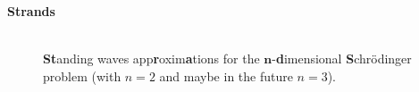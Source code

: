 
\begin{center}
    \begin{minipage}{.8\textwidth}
        \begin{description}
            \item[\textbf{Strands}] \hfill\\ \textbf{St}anding waves app\textbf{r}oxim\textbf{a}tions for the $\bm{n}$-\textbf{d}imensional \textbf{S}chrödinger problem (with $n = 2$ and maybe in the future $n = 3$).
        \end{description}
    \end{minipage}
\end{center}





